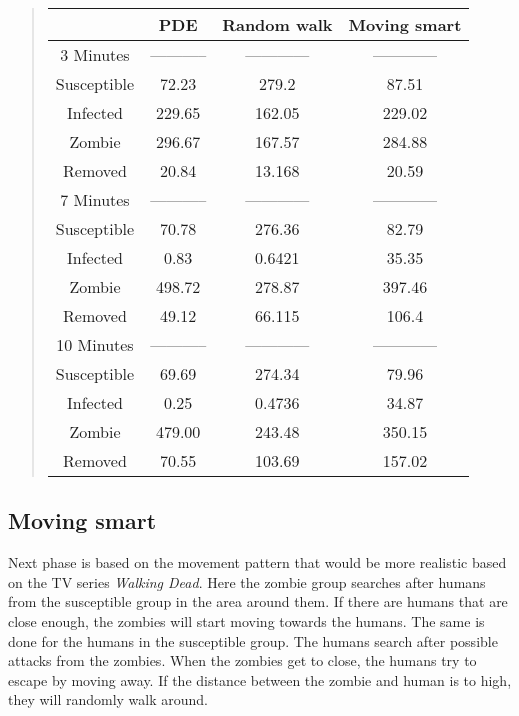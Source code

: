 \documentclass[%
twoside,                 %
final,                   %
chapterprefix=true,      %
open=right               %
10pt]{book}
\begin{document}
\begin{quote}
\begin{tabular}{cccc}
\hline
\multicolumn{1}{c}{  } & \multicolumn{1}{c}{ PDE } & \multicolumn{1}{c}{ Random walk } & \multicolumn{1}{c}{ Moving smart } \\
\hline
3 Minutes   & ----------- & ------------ & ------------ \\
\hline
Susceptible & 72.23       & 279.2        & 87.51        \\
Infected    & 229.65      & 162.05       & 229.02       \\
Zombie      & 296.67      & 167.57       & 284.88       \\
Removed     & 20.84       & 13.168       & 20.59        \\
\hline
7 Minutes   & ----------- & ------------ & ------------ \\
\hline
Susceptible & 70.78       & 276.36       & 82.79        \\
Infected    & 0.83        & 0.6421       & 35.35        \\
Zombie      & 498.72      & 278.87       & 397.46       \\
Removed     & 49.12       & 66.115       & 106.4        \\
\hline
10 Minutes  & ----------- & ------------ & ------------ \\
\hline
Susceptible & 69.69       & 274.34       & 79.96        \\
Infected    & 0.25        & 0.4736       & 34.87        \\
Zombie      & 479.00      & 243.48       & 350.15       \\
Removed     & 70.55       & 103.69       & 157.02       \\
\hline
\end{tabular}
\end{quote}

\noindent



\subsection{Moving smart}
Next phase is based on the movement pattern that would be more realistic based on the TV series \emph{Walking Dead}. Here the zombie group searches after humans from the susceptible group in the area around them. If there are humans that are close enough, the zombies will start moving towards the humans. The same is done for the humans in the susceptible group. The humans search after possible attacks from the zombies. When the zombies get to close, the humans try to escape by moving away. If the distance between the zombie and human is to high, they will randomly walk around. 
\end{document}
